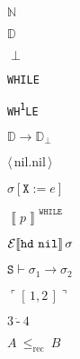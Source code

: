 \documentclass[11pt]{article}
\newcommand{\Nn}{\mathbb{N}}
\newcommand{\Data}{\mathbb{D}}
\newcommand{\While}{\texttt{WHILE}}
\newcommand{\WI}{\texttt{WH\textsuperscript{1}LE}}
\newcommand{\funspace}[2]{ {#1} \rightarrow {#2} }
\newcommand{\undef}{\perp}
\newcommand{\Dundef}{\Data_{\undef}}
\newcommand{\nil}{\mathrm{nil}}
\newcommand{\pair}[2]{\langle\, {#1}.{#2}\, \rangle }
\newcommand{\storeupdate}[3]{%
{#1}[\mathtt{#2}:={#3}]}
\newcommand{\sem}[1]{%
  \left\llbracket #1
  \right\rrbracket}
\newcommand{\expsem}[2]{%
{\cal E}{\left\llbracket #1 \right\rrbracket}  \, {#2}
}
\newcommand{\opsem}[3]{%
\mathtt{#1} \vdash {#2} \rightarrow {#3}}
\newcommand{\encode}[1]{\ulcorner {#1} \urcorner}
\newcommand{\myminus}{\ensuremath{\dot{\texttt{-}}}}
\newcommand{\reduce}{\ensuremath{\leq_{\mathrm{rec}}}}
\begin{document}
\large

$\Nn$

$\Data$

$\undef$

\While

\WI

$\funspace{\Data}{\Dundef}$

 
$\pair{\nil}{\nil}$

$\storeupdate{\sigma}{X}{e}$


$\sem{p}^\While$

$\expsem{\mathtt{hd}\ \mathtt{nil}}{\sigma}$

$\opsem{S}{\sigma_1}{\sigma_2}$
 
  
 $\encode{[\, 1, 2\, ]}$

$3\ \myminus\ 4$

$A\ \reduce\ B$
\end{document}
